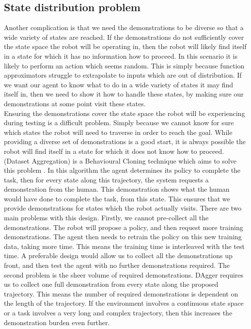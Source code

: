 \subsection{State distribution problem}
Another complication is that we need the demonstrations to be diverse so that a wide variety of states are reached. If the demonstrations do not sufficiently cover the state space the robot will be operating in, then the robot will likely find itself in a state for which it has no information how to proceed. In this scenario it is likely to perform an action which seems random. This is simply because function approximators struggle to extrapolate to inputs which are out of distribution. If we want our agent to know what to do in a wide variety of states it may find itself in, then we need to show it how to handle these states, by making sure our demonstrations at some point visit these states.\\

Ensuring the demonstrations cover the state space the robot will be experiencing during testing is a difficult problem. Simply because we cannot know for sure which states the robot will need to traverse in order to reach the goal. While providing a diverse set of demonstrations is a good start, it is always possible the robot will find itself in a state for which it does not know how to proceed.  (Dataset Aggregation) is a Behavioural Cloning technique which aims to solve this problem \cite{dagger}. In this algorithm the agent determines its policy to complete the task, then for every state along this trajectory, the system requests a demonstration from the human. This demonstration shows what the human would have done to complete the task, from this state. This ensures that we provide demonstrations for states which the robot actually visits. There are two main problems with this design. Firstly, we cannot pre-collect all the demonstrations. The robot will propose a policy, and then request more training demonstrations. The agent then needs to retrain the policy on this new training data, taking more time. This means the training time is interleaved with the test time. A preferable design would allow us to collect all the demonstrations up front, and then test the agent with no further demonstrations required. The second problem is the sheer volume of required demonstrations. DAgger requires us to collect one full demonstration from every state along the proposed trajectory. This means the number of required demonstrations is dependent on the length of the trajectory. If the environment involves a continuous state space or a task involves a very long and complex trajectory, then this increases the demonstration burden even further.\\

